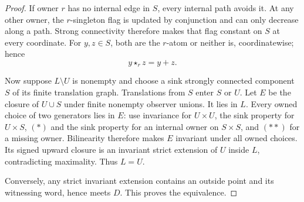 \begin{proof}
If owner $r$ has no internal edge in $S$, every internal path avoids it.
At any other owner, the $r$-singleton flag is updated by conjunction and
can only decrease along a path. Strong connectivity therefore makes that
flag constant on $S$ at every coordinate. For $y,z\in S$, both are the
$r$-atom or neither is, coordinatewise; hence
\[
 y\star_r z=y+z.                                    \tag{$**$}
\]

Now suppose $L\setminus U$ is nonempty and choose a sink strongly
connected component $S$ of its finite translation graph. Translations
from $S$ enter $S$ or $U$. Let $E$ be the closure of $U\cup S$ under
finite nonempty observer unions. It lies in $L$. Every owned choice of
two generators lies in $E$: use invariance for $U\times U$, the sink
property for $U\times S$, $(*)$ and the sink property for an internal
owner on $S\times S$, and $(**)$ for a missing owner. Bilinearity
therefore makes $E$ invariant under all owned choices. Its signed upward
closure is an invariant strict extension of $U$ inside $L$, contradicting
maximality. Thus $L=U$.

Conversely, any strict invariant extension contains an outside point and
its witnessing word, hence meets $D$. This proves the equivalence.
\end{proof}

